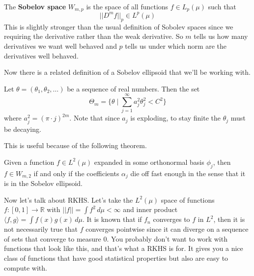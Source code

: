 \documentclass{article}
\begin{document}
    \begin{definition}
      The \textbf{Sobelov space} $W_{m, p}$ is the space of all functions $f \in L_p (\mu)$ such that 
      \begin{equation}
        ||D^m f||_p \in L^p (\mu)
      \end{equation}
      This is slightly stronger than the usual definition of Sobolev spaces since we requiring the derivative rather than the weak derivative. So $m$ tells us how many derivatives we want well behaved and $p$ tells us under which norm are the derivatives well behaved. 
    \end{definition}

    Now there is a related definition of a Sobelov ellipsoid that we'll be working with. 

    \begin{definition}
      Let $\theta = (\theta_1, \theta_2, \ldots)$ be a sequence of real numbers. Then the set 
      \begin{equation}
        \Theta_m = \bigg\{ \theta \mid \sum_{j=1}^\infty a_j^2 \theta_j^2 < C^2 \bigg\}
      \end{equation}
      where $a_j^2 = (\pi \cdot j)^{2m}$. Note that since $a_j$ is exploding, to stay finite the $\theta_j$ must be decaying.
    \end{definition}

    This is useful because of the following theorem. 
    
    \begin{theorem}
      Given a function $f \in L^2(\mu)$ expanded in some orthonormal basis $\phi_j$, then $f \in W_{m, 2}$ if and only if the coefficients $\alpha_j$ die off fast enough in the sense that it is in the Sobelov ellipsoid. 
    \end{theorem}

    Now let's talk about RKHS. Let's take the $L^2(\mu)$ space of functions $f: [0, 1] \rightarrow \mathbb{R}$ with $||f|| = \int f^2 \,d\mu < \infty$ and inner product $\langle f, g \rangle = \int f(x) g(x) \,d\mu$. It is known that if $f_n$ converges to $f$ in $L^2$, then it is not necessarily true that $f$ converges pointwise since it can diverge on a sequence of sets that converge to measure $0$. You probably don't want to work with functions that look like this, and that's what a RKHS is for. It gives you a nice class of functions that have good statistical properties but also are easy to compute with.  
\end{document}
